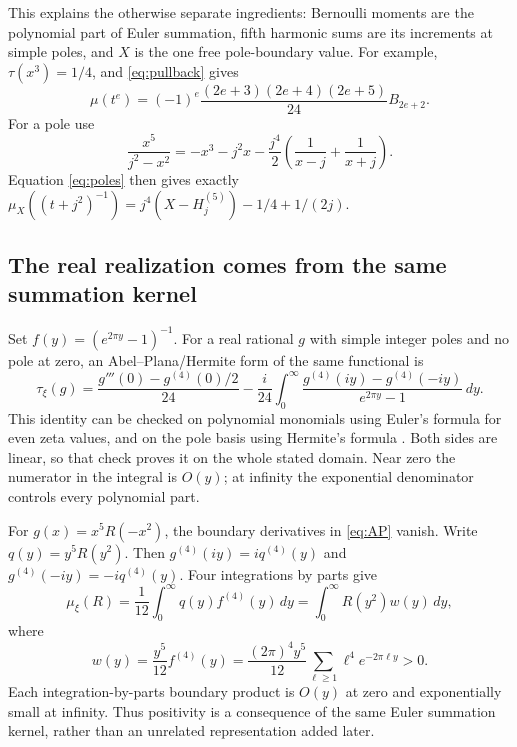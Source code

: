 \documentclass[11pt]{article}
\theoremstyle{definition}
\theoremstyle{remark}\newtheorem*{remark}{Remark}
\newcommand{\dd}{\,d}
\begin{document}
This explains the otherwise separate ingredients: Bernoulli moments are the
polynomial part of Euler summation, fifth harmonic sums are its increments at
simple poles, and $X$ is the one free pole-boundary value. For example,
$\tau(x^3)=1/4$, and \eqref{eq:pullback} gives
\[
 \mu(t^e)=(-1)^e\frac{(2e+3)(2e+4)(2e+5)}{24}B_{2e+2}.
\]
For a pole use
\[
 \frac{x^5}{j^2-x^2}
 =-x^3-j^2x-\frac{j^4}{2}\left(\frac1{x-j}+\frac1{x+j}\right).
\]
Equation \eqref{eq:poles} then gives exactly
$\mu_X((t+j^2)^{-1})=j^4(X-H_j^{(5)})-1/4+1/(2j)$.

\subsection{The real realization comes from the same summation kernel}
Set $f(y)=(e^{2\pi y}-1)^{-1}$. For a real rational $g$ with simple integer
poles and no pole at zero, an Abel--Plana/Hermite form of the same functional is
\begin{equation}\label{eq:AP}
 \tau_\xi(g)=\frac{g'''(0)-g^{(4)}(0)/2}{24}
 -\frac{i}{24}\int_0^\infty
 \frac{g^{(4)}(iy)-g^{(4)}(-iy)}{e^{2\pi y}-1}\dd y.
\end{equation}
This identity can be checked on polynomial monomials using Euler's formula for
even zeta values, and on the pole basis using Hermite's formula
\cite{Hurwitz,Euler}. Both sides are linear, so that check proves it on the
whole stated domain. Near zero the numerator in the integral is $O(y)$; at
infinity the exponential denominator controls every polynomial part.

For $g(x)=x^5R(-x^2)$, the boundary derivatives in \eqref{eq:AP} vanish.
Write $q(y)=y^5R(y^2)$. Then $g^{(4)}(iy)=iq^{(4)}(y)$ and
$g^{(4)}(-iy)=-iq^{(4)}(y)$. Four integrations by parts give
\begin{equation}\label{eq:positive}
 \mu_\xi(R)=\frac1{12}\int_0^\infty q(y)f^{(4)}(y)\dd y
 =\int_0^\infty R(y^2)w(y)\dd y,
\end{equation}
where
\begin{equation}\label{eq:weight}
 w(y)=\frac{y^5}{12}f^{(4)}(y)
 =\frac{(2\pi)^4y^5}{12}\sum_{\ell\ge1}\ell^4e^{-2\pi\ell y}>0.
\end{equation}
Each integration-by-parts boundary product is $O(y)$ at zero and exponentially
small at infinity. Thus positivity is a consequence of the same Euler summation
kernel, rather than an unrelated representation added later.
\end{document}
